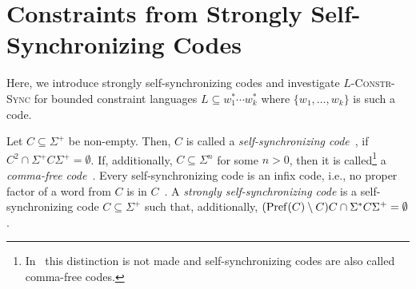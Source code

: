 \section{Constraints from Strongly Self-Synchronizing Codes}
\label{sec:strongly_self_sync}
%

Here, we introduce strongly self-synchronizing codes and investigate $L$\textsc{-Constr-Sync}
for bounded constraint languages $L \subseteq w_1^* \cdots w_k^*$
where $\{ w_1, \ldots, w_k \}$ is such a code. %

Let $C \subseteq \Sigma^+$ be non-empty.
Then, $C$ is called a \emph{self-synchronizing code}~\cite{zbMATH03943051,DBLP:books/daglib/0025093,Hsieh1989SomeAP},
if $C^2 \cap \Sigma^+ C \Sigma^+ = \emptyset$. If, additionally, $C \subseteq \Sigma^n$
for some $n > 0$, then it is called\footnote{In~\cite{Hsieh1989SomeAP}
 this distinction is not made and self-synchronizing codes are also called comma-free codes.}
a \emph{comma-free code}~\cite{golomb_gordon_welch_1958}.
Every self-synchronizing code is an infix code, i.e., no proper factor of a word from $C$ is in $C$~\cite{Hsieh1989SomeAP}.
A \emph{strongly self-synchronizing code}
is a self-synchronizing code $C \subseteq \Sigma^+$ 
such that, additionally, $(\operatorname{Pref}(C) \setminus C)C \cap \Sigma^*C \Sigma^+ = \emptyset$.
